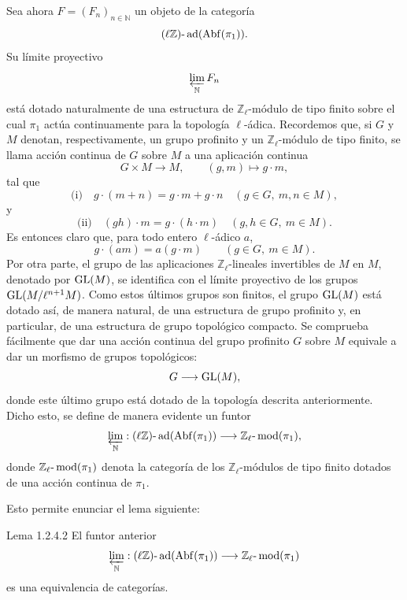 Sea ahora \(F=(F_n)_{n\in\mathbb N}\) un objeto de la categoría
\[
(\ell\mathbb Z)\text{-}\operatorname{ad}(\operatorname{Abf}(\pi_1)).
\]
Su límite proyectivo
\[
\varprojlim_{\mathbb N}F_n
\]
está dotado naturalmente de una estructura de \(\mathbb Z_\ell\)-módulo de tipo finito sobre el cual \(\pi_1\) actúa continuamente para la topología \(\ell\)-ádica. Recordemos que, si \(G\) y \(M\) denotan, respectivamente, un grupo profinito y un \(\mathbb Z_\ell\)-módulo de tipo finito, se llama acción continua de \(G\) sobre \(M\) a una aplicación continua
\[
G\times M\longrightarrow M,\qquad (g,m)\longmapsto g\cdot m,
\]
tal que
\[
\text{(i)}\quad g\cdot(m+n)=g\cdot m+g\cdot n\quad (g\in G,\ m,n\in M),
\]
y
\[
\text{(ii)}\quad (gh)\cdot m=g\cdot(h\cdot m)\quad (g,h\in G,\ m\in M).
\]
Es entonces claro que, para todo entero \(\ell\)-ádico \(a\),
\[
g\cdot(am)=a(g\cdot m)\qquad (g\in G,\ m\in M).
\]
Por otra parte, el grupo de las aplicaciones \(\mathbb Z_\ell\)-lineales invertibles de \(M\) en \(M\), denotado por \(\operatorname{GL}(M)\), se identifica con el límite proyectivo de los grupos \(\operatorname{GL}(M/\ell^{n+1}M)\). Como estos últimos grupos son finitos, el grupo \(\operatorname{GL}(M)\) está dotado así, de manera natural, de una estructura de grupo profinito y, en particular, de una estructura de grupo topológico compacto. Se comprueba fácilmente que dar una acción continua del grupo profinito \(G\) sobre \(M\) equivale a dar un morfismo de grupos topológicos:
\[
G\longrightarrow \operatorname{GL}(M),
\]
donde este último grupo está dotado de la topología descrita anteriormente. Dicho esto, se define de manera evidente un funtor
\[
\varprojlim_{\mathbb N}:(\ell\mathbb Z)\text{-}\operatorname{ad}(\operatorname{Abf}(\pi_1))\longrightarrow
\mathbb Z_\ell\text{-}\operatorname{mod}(\pi_1),
\]
donde \(\mathbb Z_\ell\text{-}\operatorname{mod}(\pi_1)\) denota la categoría de los \(\mathbb Z_\ell\)-módulos de tipo finito dotados de una acción continua de \(\pi_1\).

Esto permite enunciar el lema siguiente:

\begin{statement}{Lema 1.2.4.2}
El funtor anterior
\[
\varprojlim_{\mathbb N}:(\ell\mathbb Z)\text{-}\operatorname{ad}(\operatorname{Abf}(\pi_1))
\longrightarrow \mathbb Z_\ell\text{-}\operatorname{mod}(\pi_1)
\]
es una equivalencia de categorías.
\end{statement}

